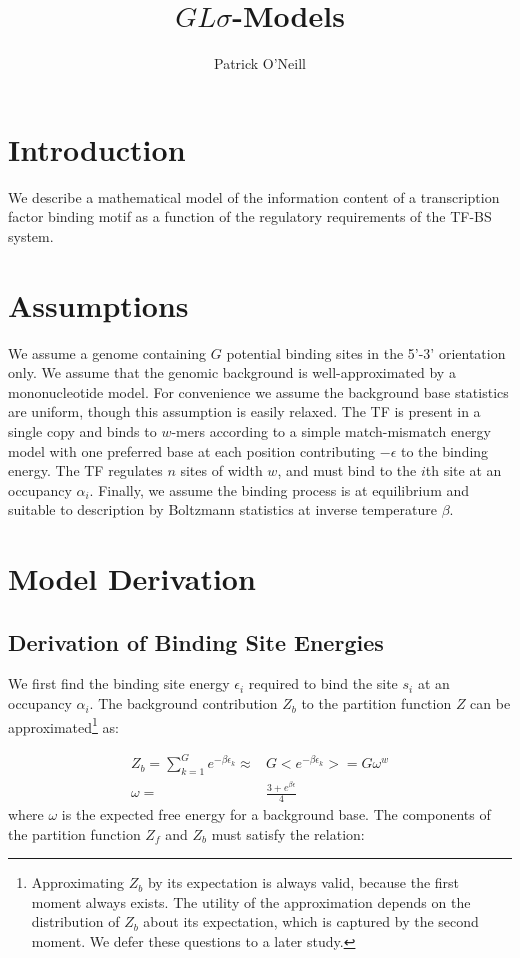 \documentclass{article}
\title{$GL\sigma$-Models}
\author{Patrick O'Neill}
\begin{document}
\maketitle{}

\section{Introduction}
We describe a mathematical model of the information content of a
transcription factor binding motif as a function of the regulatory
requirements of the TF-BS system.
\section{Assumptions}
We assume a genome containing $G$ potential binding sites in the 5'-3'
orientation only.  We assume that the genomic background is
well-approximated by a mononucleotide model.  For convenience we
assume the background base statistics are uniform, though this
assumption is easily relaxed.  The TF is present in a single copy and
binds to $w$-mers according to a simple match-mismatch energy model with
one preferred base at each position contributing $-\epsilon$ to the
binding energy.  The TF regulates $n$ sites of width $w$, and must
bind to the $i$th site at an occupancy $\alpha_i$.  Finally, we assume
the binding process is at equilibrium and suitable to description by
Boltzmann statistics at inverse temperature $\beta$.

\section{Model Derivation}
\subsection{Derivation of Binding Site Energies}
We first find the binding site energy $\epsilon_i$ required to bind
the site $s_i$ at an occupancy $\alpha_i$.  The background
contribution $Z_b$ to the partition function $Z$ can be
approximated\footnote{Approximating $Z_b$ by its expectation is always
  valid, because the first moment always exists.  The utility of the
  approximation depends on the distribution of $Z_b$ about its
  expectation, which is captured by the second moment.  We defer these
  questions to a later study.} as:

\begin{align}
  Z_b = \sum_{k=1}^Ge^{-\beta\epsilon_k}\approx& G<e^{-\beta\epsilon_k}> = G\omega^w  \label{eq:Zb}\\
  \omega =& \frac{3 + e^{\beta\epsilon}}{4}  \label{eq:omega}
\end{align}
where $\omega$ is the expected free energy for a background base.  The
components of the partition function $Z_f$ and $Z_b$ must satisfy the
relation:
\end{document}
